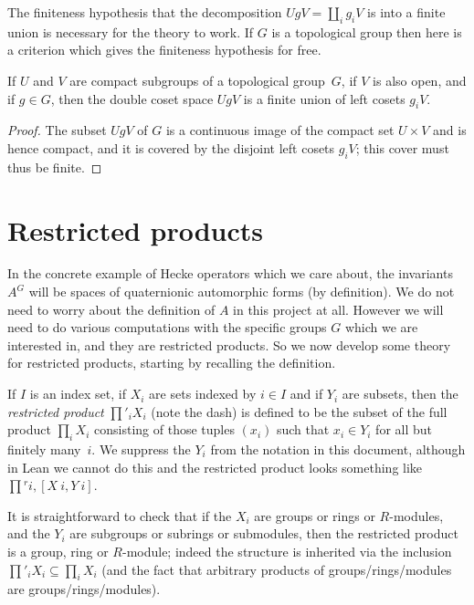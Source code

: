 The finiteness hypothesis that the decomposition $UgV=\coprod_i g_iV$ is
into a finite union is necessary for the theory to work. If $G$ is a topological
group then here is a criterion which gives the finiteness hypothesis for free.

\begin{lemma}
  \label{QuotientGroup.mk_image_finite_of_compact_of_open}
  \leanok
  If $U$ and $V$ are compact subgroups of a topological group~$G$,
  if $V$ is also open, and if $g\in G$, then the double coset space $UgV$
  is a finite union of left cosets $g_iV$.
\end{lemma}
\begin{proof}
  The subset $UgV$ of $G$ is a continuous image of the compact set $U\times V$
  and is hence compact, and it is covered by the disjoint left cosets $g_iV$;
  this cover must thus be finite.
\end{proof}

\section{Restricted products}

In the concrete example of Hecke operators which we care about, the invariants $A^G$
will be spaces of quaternionic automorphic
forms (by definition). We do not need to worry about the definition of $A$ in this
project at all. However we will need to do various computations with the
specific groups $G$ which we are interested in, and they are restricted products.
So we now develop some theory for restricted products,
starting by recalling the definition.

If $I$ is an index set, if $X_i$ are sets indexed by $i\in I$ and if $Y_i$
are subsets, then the \emph{restricted product} $\prod'_iX_i$ (note the dash) is defined
to be the subset of the full product $\prod_i X_i$ consisting of those
tuples $(x_i)$ such that $x_i\in Y_i$ for all but finitely many~$i$. We suppress
the $Y_i$ from the notation in this document, although in Lean we cannot do this and
the restricted product looks something like $\prod{}^{r} i,[X\ i, Y\ i]$.

It is straightforward to check that if the $X_i$ are groups or rings or $R$-modules,
and the $Y_i$ are subgroups or subrings or submodules, then the restricted product
is a group, ring or $R$-module; indeed the structure is inherited via the
inclusion $\prod'_iX_i\subseteq\prod_iX_i$ (and the fact that arbitrary products
of groups/rings/modules are groups/rings/modules).

